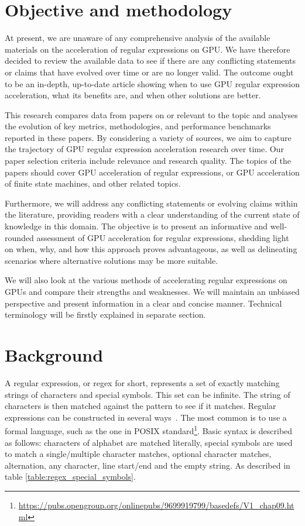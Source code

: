 \documentclass[10pt,onecolumn,twoside,english,a4paper]{article}
\begin{document}
\section{Objective and methodology} \label{Objective}
At present, we are unaware of any comprehensive analysis of the available materials on the acceleration of regular expressions on GPU. We have therefore decided to review the available data to see if there are any conflicting statements or claims that have evolved over time or are no longer valid. The outcome ought to be an in-depth, up-to-date article showing when to use GPU regular expression acceleration, what its benefits are, and when other solutions are better.

This research compares data from papers on or relevant to the topic and analyses the evolution of key metrics, methodologies, and performance benchmarks reported in these papers. By considering a variety of sources, we aim to capture the trajectory of GPU regular expression acceleration research over time.
Our paper selection criteria include relevance and research quality. The topics of the papers should cover GPU acceleration of regular expressions, or GPU acceleration of finite state machines, and other related topics.

Furthermore, we will address any conflicting statements or evolving claims within the literature, providing readers with a clear understanding of the current state of knowledge in this domain. The objective is to present an informative and well-rounded assessment of GPU acceleration for regular expressions, shedding light on when, why, and how this approach proves advantageous, as well as delineating scenarios where alternative solutions may be more suitable.

We will also look at the various methods of accelerating regular expressions on GPUs and compare their strengths and weaknesses.
We will maintain an unbiased perspective and present information in a clear and concise manner. Technical terminology will be firstly explained in separate section.


\section{Background} \label{Background}
A regular expression, or regex for short, represents a set of exactly matching strings of characters and special symbols. This set can be infinite. The string of characters is then matched against the pattern to see if it matches. Regular expressions can be constructed in several ways~\cite{wang2014techniques}. The most common is to use a formal language, such as the one in POSIX standard\footnote{\url{https://pubs.opengroup.org/onlinepubs/9699919799/basedefs/V1_chap09.html}}.
Basic syntax is described as follows: characters of alphabet are matched literally, special symbols are used to match a single/multiple character matches, optional character matches, alternation, any character, line start/end and the empty string. As described in table \ref{table:regex_special_symbols}.
\end{document}
